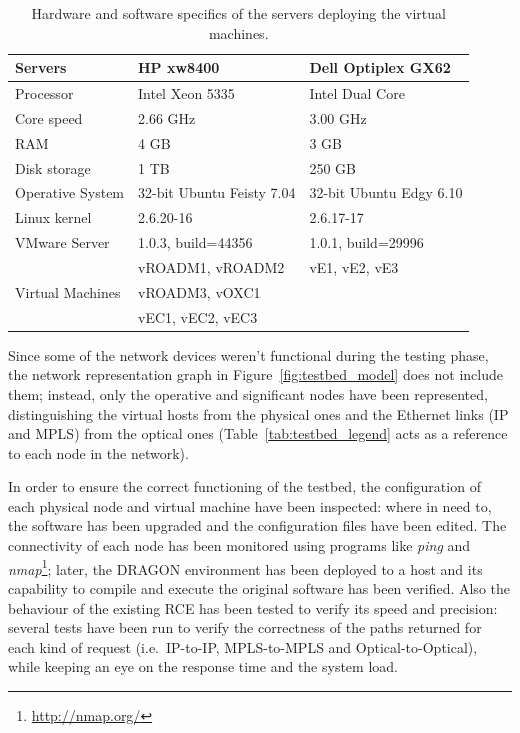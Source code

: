 \documentclass[10pt,a4paper]{report}
\begin{document}
\begin{table}[!htbp]
  \begin{center}
    \begin{tabular}{|l|l|l|}
      \hline
      Servers & \textbf{HP xw8400} & \textbf{Dell Optiplex GX62} \\
      \hline \hline
      Processor & Intel Xeon 5335 & Intel Dual Core\\ \hline
      Core speed & 2.66 GHz & 3.00 GHz \\ \hline
      RAM & 4 GB & 3 GB \\ \hline
      Disk storage & 1 TB & 250 GB \\ \hline
      Operative System & 32-bit Ubuntu Feisty 7.04 & 32-bit Ubuntu Edgy
      6.10 \\ \hline
      Linux kernel & 2.6.20-16 & 2.6.17-17 \\ \hline
      VMware Server & 1.0.3, build=44356 & 1.0.1, build=29996 \\ \hline
      \multirow{3}{*}{Virtual Machines} & vROADM1, vROADM2 & vE1, vE2,
      vE3 \\
      & vROADM3, vOXC1 & \\
      & vEC1, vEC2, vEC3 & \\ \hline
    \end{tabular}
    \caption[VM servers specifics]{Hardware and software
      specifics of the servers deploying the virtual machines.}
    \label{tab:testbed_vm}
  \end{center}
\end{table}
 
Since some of the network devices weren't functional during the
testing phase, the network representation graph in
Figure~\ref{fig:testbed_model} does not include them; instead, only
the operative and significant nodes have been represented,
distinguishing the virtual hosts from the physical ones and the
Ethernet links (IP and MPLS) from the optical ones
(Table~\ref{tab:testbed_legend} acts as a reference to each node in
the network).

In order to ensure the correct functioning of the testbed, the
configuration of each physical node and virtual machine have been
inspected: where in need to, the software has been upgraded and the
configuration files have been edited. The connectivity of each node
has been monitored using programs like \textit{ping} and
\textit{nmap}\footnote{\url{http://nmap.org/}}; later, the DRAGON
environment has been deployed to a host and its capability to compile
and execute the original software has been verified. Also the
behaviour of the existing RCE has been tested to verify its speed and
precision: several tests have been run to verify the correctness of
the paths returned for each kind of request (i.e.\ IP-to-IP,
MPLS-to-MPLS and Optical-to-Optical), while keeping an eye on the
response time and the system load.
\end{document}
